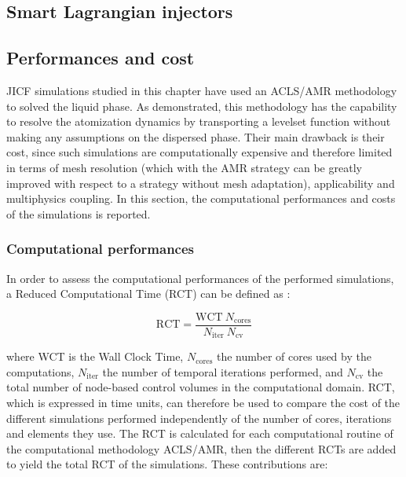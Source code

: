\subsection{Smart Lagrangian injectors}
\label{sec:ch5_learning_SLI}




\subsection{Performances and cost}
\label{subsec:ch5_computational_performances}

JICF simulations studied in this chapter have used an ACLS/AMR methodology to solved the liquid phase. As demonstrated, this methodology has the capability to resolve the atomization dynamics by transporting a levelset function without making any assumptions on the dispersed phase. Their main drawback is their cost, since such simulations are computationally expensive and therefore limited in terms of mesh resolution (which with the AMR strategy can be greatly improved with respect to a strategy without mesh adaptation), applicability and multiphysics coupling. In this section, the computational performances and costs of the simulations is reported. 

\subsubsection*{Computational performances}

In order to assess the computational performances of the performed simulations, a Reduced Computational Time (RCT) can be defined as :

\begin{equation}
\label{eq:RCT_definition}
\mathrm{RCT} = \frac{\mathrm{WCT} ~ N_\mathrm{cores}}{N_\mathrm{iter}~N_\mathrm{cv}}
\end{equation}

where WCT is the Wall Clock Time, $N_\mathrm{cores}$ the number of cores used by the computations, $N_\mathrm{iter}$ the number of temporal iterations performed, and $N_\mathrm{cv}$ the total number of node-based control volumes in the computational domain. RCT, which is expressed in time units, can therefore be used to compare the cost of the different simulations performed independently of the number of cores, iterations and elements they use. The RCT is calculated for each computational routine of the computational methodology ACLS/AMR, then the different RCTs are added to yield the total RCT of the simulations. These contributions are:

